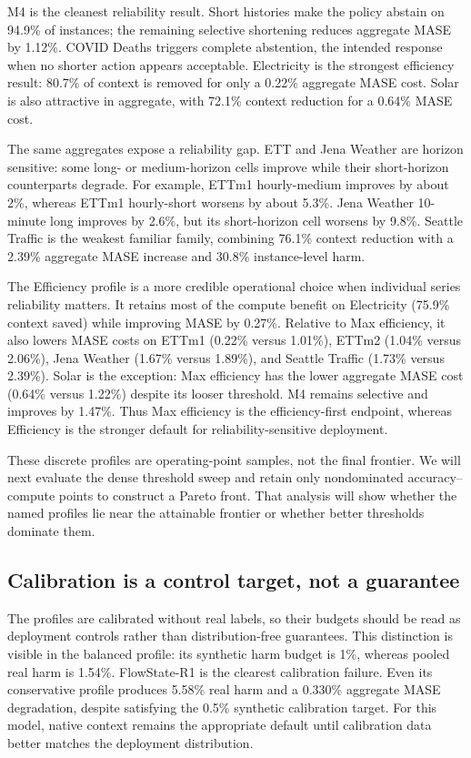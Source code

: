 M4 is the cleanest reliability result.  Short histories make the policy abstain
on 94.9\% of instances; the remaining selective shortening reduces aggregate
MASE by 1.12\%.  COVID Deaths triggers complete abstention, the intended
response when no shorter action appears acceptable.  Electricity is the
strongest efficiency result: 80.7\% of context is removed for only a 0.22\%
aggregate MASE cost.  Solar is also attractive in aggregate, with 72.1\%
context reduction for a 0.64\% MASE cost.

The same aggregates expose a reliability gap.  ETT and Jena Weather are
horizon sensitive: some long- or medium-horizon cells improve while their
short-horizon counterparts degrade.  For example, ETTm1 hourly-medium improves
by about 2\%, whereas ETTm1 hourly-short worsens by about 5.3\%.  Jena Weather
10-minute long improves by 2.6\%, but its short-horizon cell worsens by 9.8\%.
Seattle Traffic is the weakest familiar family, combining 76.1\% context
reduction with a 2.39\% aggregate MASE increase and 30.8\% instance-level harm.

The Efficiency profile is a more credible operational choice when individual
series reliability matters.  It retains most of the compute benefit on
Electricity (75.9\% context saved) while improving MASE by 0.27\%.  Relative to
Max efficiency, it also lowers MASE costs on ETTm1 (0.22\% versus 1.01\%), ETTm2
(1.04\% versus 2.06\%), Jena Weather (1.67\% versus 1.89\%), and Seattle
Traffic (1.73\% versus 2.39\%).  Solar is the exception: Max efficiency has the
lower aggregate MASE cost (0.64\% versus 1.22\%) despite its looser threshold.
M4 remains
selective and improves by 1.47\%.  Thus Max efficiency is the efficiency-first
endpoint, whereas Efficiency is the stronger default for reliability-sensitive
deployment.

These discrete profiles are operating-point samples, not the final frontier.
We will next evaluate the dense threshold sweep and retain only nondominated
accuracy--compute points to construct a Pareto front.  That analysis will show
whether the named profiles lie near the attainable frontier or whether better
thresholds dominate them.

\subsection{Calibration is a control target, not a guarantee}
\label{sec:risk-limits}

The profiles are calibrated without real labels, so their budgets should be
read as deployment controls rather than distribution-free guarantees.  This
distinction is visible in the balanced profile: its synthetic harm budget is
1\%, whereas pooled real harm is 1.54\%.  FlowState-R1 is the clearest
calibration failure.  Even its conservative profile produces 5.58\% real harm
and a 0.330\% aggregate MASE degradation, despite satisfying the 0.5\%
synthetic calibration target.  For this model, native context remains the
appropriate default until calibration data better matches the deployment
distribution.

